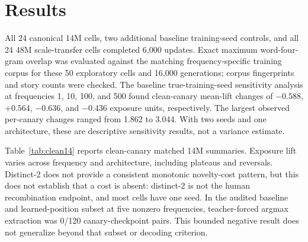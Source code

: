 \documentclass[conference]{IEEEtran}
\begin{document}
\section{Results}
All 24 canonical 14M cells, two additional baseline training-seed controls, and all 24 48M scale-transfer cells
completed 6,000 updates. Exact maximum word-four-gram overlap was evaluated against the matching frequency-specific
training corpus for these 50 exploratory cells and 16,000 generations; corpus fingerprints and story counts were checked. The
baseline true-training-seed sensitivity analysis at frequencies 1, 10, 100, and 500 found clean-canary mean-lift
changes of $-0.588$, $+0.564$, $-0.636$, and $-0.436$ exposure units, respectively. The largest observed
per-canary changes ranged from 1.862 to 3.044. With two seeds and one architecture, these are descriptive
sensitivity results, not a variance estimate.

Table~\ref{tab:clean14} reports clean-canary matched 14M summaries. Exposure lift varies across frequency and
architecture, including plateaus and reversals. Distinct-2 does not provide a consistent monotonic novelty-cost
pattern, but this does not establish that a cost is absent: distinct-2 is not the human recombination endpoint,
and most cells have one seed. In the audited baseline and learned-position subset at five nonzero frequencies,
teacher-forced argmax extraction was 0/120 canary-checkpoint pairs. This bounded negative result does not
generalize beyond that subset or decoding criterion.

\begin{table}[t]
\centering
\caption{Clean-canary descriptive summaries for the canonical 14M grid. Each cell is exposure lift over the
architecture-matched zero-insertion model / distinct-2 proxy. Most architecture-frequency conditions are one
training seed. These are descriptive summaries, not inferential estimates of a creativity effect.}
\label{tab:clean14}
\end{table}
\end{document}
